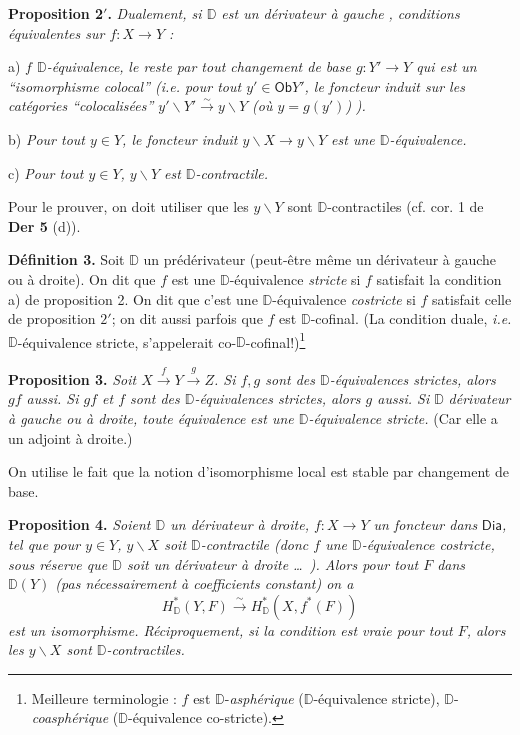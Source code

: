 \documentclass[11pt]{article}
\newcommand{\printedpage}[1]{\marginpar{\footnotesize p.~#1}}
\newcommand{\msp}[1]{\marginpar{\footnotesize [#1]}}
\newcommand{\Ob}{\mathsf{Ob}}
\newcommand{\Dia}{\mathsf{Dia}}
\newcommand{\DD}{\mathbb{D}}
\newcommand{\isolongto}{\overset{\sim}{\longrightarrow}}
\begin{document}
\noindent\textbf{Proposition 2$'$.} \textit{Dualement, si $\DD$ est un dérivateur à gauche} \textit{, conditions équivalentes sur $f : X \to Y$ :}

a) \textit{$f$ $\DD$-équivalence,} \textit{le reste par tout changement de base $g : Y' \to Y$ qui est un “isomorphisme colocal” (i.e. pour tout $y' \in \Ob Y'$, le foncteur induit sur les catégories “colocalisées” $y'\backslash Y' \isolongto y\backslash Y$ (où $y = g(y')$)} \textit{).}

b) \textit{Pour tout $y \in Y$, le foncteur induit $y\backslash X \to y\backslash Y$ est une $\DD$-équivalence.}

c) \textit{Pour tout $y \in Y$, $y\backslash Y$ est $\DD$-contractile.}

\noindent Pour le prouver, on doit utiliser que les $y\backslash Y$ sont $\DD$-contractiles (cf. cor. 1 de \textbf{Der 5} (d)).

\clearpage
\printedpage{38}
\noindent\msp{page 65}

\noindent\textbf{Définition 3.} Soit $\DD$ un prédérivateur (peut-être même un dérivateur à gauche ou à droite). On dit que $f$ est une $\DD$-équivalence \textit{stricte} si $f$ satisfait la condition a) de proposition 2. On dit que c'est une $\DD$-équivalence \textit{costricte} si $f$ satisfait celle de proposition $2'$; on dit aussi parfois que $f$ est $\DD$-cofinal. (La condition duale, \textit{i.e.} $\DD$-équivalence stricte, s'appelerait co-$\DD$-cofinal!)\footnote[27]{Meilleure terminologie : $f$ est $\DD$-\textit{asphérique} ($\DD$-équivalence stricte), $\DD$-\textit{coasphérique} ($\DD$-équivalence co-stricte).} %

\noindent\textbf{Proposition 3.} \textit{Soit $X \overset{f}{\to} Y \overset{g}{\to} Z$. Si $f, g$ sont des $\DD$-équivalences strictes, alors $gf$ aussi. Si $gf$ et $f$ sont des $\DD$-équivalences strictes, alors $g$ aussi. Si $\DD$} \textit{dérivateur à gauche ou à droite, toute équivalence} \textit{est une $\DD$-équivalence stricte.} (Car elle a un adjoint à droite.)

On utilise le fait que la notion d'isomorphisme local est stable par changement de base.

\noindent\msp{page 66}

\noindent\textbf{Proposition 4.} \textit{Soient $\DD$ un dérivateur à droite, $f : X \to Y$ un foncteur dans} $\Dia$\textit{, tel que pour $y \in Y$, $y\backslash X$ soit $\DD$-contractile (donc $f$ une $\DD$-équivalence costricte, sous réserve que $\DD$ soit un dérivateur à droite \ldots\ ). Alors pour tout $F$ dans $\DD(Y)$ (pas nécessairement à coefficients constant) on a} %
\[
H^*_{\DD}(Y, F) \isolongto H^*_{\DD}(X, f^*(F))
\]
\textit{est un isomorphisme. Réciproquement, si la condition est vraie pour tout $F$, alors les $y\backslash X$ sont $\DD$-contractiles.}
\end{document}
